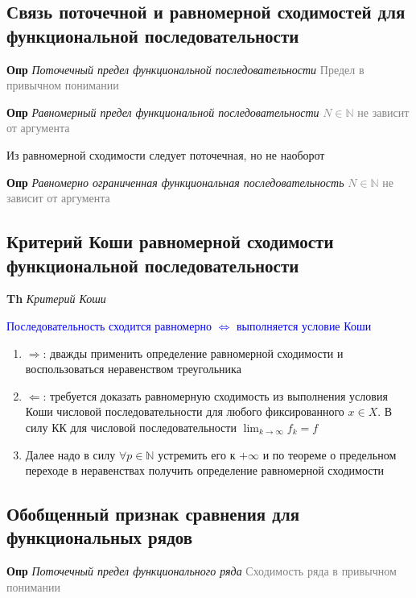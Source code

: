 \subsection{Связь поточечной и равномерной сходимостей для функциональной последовательности}

\textbf{Опр} \textit{Поточечный предел функциональной последовательности} \textcolor{gray}{Предел в привычном
понимании}

\textbf{Опр} \textit{Равномерный предел функциональной последовательности} \textcolor{gray}{$N \in \mathbb{N}$ не зависит от аргумента}

Из равномерной сходимости следует поточечная, но не наоборот

\textbf{Опр} \textit{Равномерно ограниченная функциональная последовательность} \textcolor{gray}{$N \in \mathbb{N}$
    не зависит от аргумента}

\subsection{Критерий Коши равномерной сходимости функциональной последовательности}

\textbf{Th} \textit{Критерий Коши}

\textcolor{blue}{Последовательность сходится равномерно $\Leftrightarrow$ выполняется условие Коши}

\begin{enumerate}
    \item $\Rightarrow$: дважды применить определение равномерной сходимости и воспользоваться неравенством
    треугольника
    \item $\Leftarrow$: требуется доказать равномерную сходимость из выполнения условия Коши числовой
    последовательности для любого фиксированного $x \in X$.
    В силу КК для числовой последовательности $\lim_{k\to\infty} f_k = f$
    \item Далее надо в силу $\forall p \in \mathbb{N}$ устремить его к $+\infty$ и по теореме о предельном
    переходе в неравенствах получить определение равномерной сходимости
\end{enumerate}

\subsection{Обобщенный признак сравнения для функциональных рядов}

\textbf{Опр} \textit{Поточечный предел функционального ряда} \textcolor{gray}{Сходимость ряда в привычном понимании}

